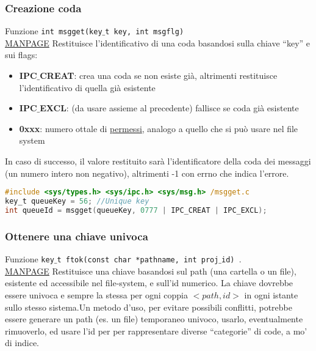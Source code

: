         \subsubsection{Creazione coda}
        Funzione \texttt{int msgget(key$\_$t key, int msgflg)}\\
        
        \href{https://man7.org/linux/man-pages/man2/msgget.2.html}{MANPAGE} Restituisce l'identificativo di una coda basandosi sulla chiave “key” e sui flags:
        \begin{itemize}
            \item \textbf{IPC$\_$CREAT}: crea una coda se non esiste già, altrimenti restituisce l'identificativo di quella già esistente
            \item \textbf{IPC$\_$EXCL}: (da usare assieme al precedente) fallisce se coda già esistente
            \item \textbf{0xxx}: numero ottale di \hyperref[sec:permessi]{permessi}, analogo a quello che si può usare nel file system 
        \end{itemize}
        
        In caso di successo, il valore restituito sarà l'identificatore della coda dei messaggi (un numero intero non negativo), altrimenti -1 con errno che indica l'errore.

        \begin{lstlisting}[language=C]
#include <sys/types.h> <sys/ipc.h> <sys/msg.h> /msgget.c
key_t queueKey = 56; //Unique key
int queueId = msgget(queueKey, 0777 | IPC_CREAT | IPC_EXCL);
        \end{lstlisting}
        
        \subsubsection{Ottenere una chiave univoca}
        Funzione \texttt{key$\_$t ftok(const char *pathname, int proj$\_$id) }. \\
        
        \href{https://man7.org/linux/man-pages/man3/ftok.3.html}{MANPAGE} Restituisce  una  chiave  basandosi  sul path  (una  cartella  o  un  file),  esistente  ed accessibile nel file-system, e sull'id numerico. La chiave dovrebbe essere univoca e sempre la stessa per ogni coppia $<path,id>$ in ogni istante sullo stesso sistema.Un metodo d'uso, per evitare possibili conflitti, potrebbe essere generare un path (es. un file) temporaneo univoco, usarlo, eventualmente rimuoverlo, ed usare l'id per per rappresentare diverse “categorie” di code, a mo' di indice.
        
